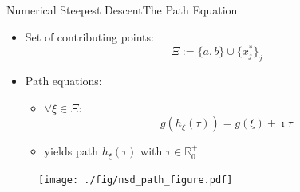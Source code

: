 \documentclass{beamer}
\begin{document}
\begin{frame}{Numerical Steepest Descent}{The Path Equation}
  \begin{minipage}{0.58\linewidth}
    \begin{itemize}
      \item Set of contributing points:
      \begin{equation*}
        \Xi := \{a, b\} \cup \{x^{*}_j\}_j
      \end{equation*}
    \end{itemize}
    \begin{itemize}
      \item Path equations:
      \begin{itemize}
        \item $\forall \xi \in \Xi$:
        \begin{equation*}
          g(h_\xi(\tau)) = g(\xi) + \imath \tau
        \end{equation*}
        \item yields path $h_{\xi}(\tau)$ with $\tau \in \mathbb{R}_0^{+}$
      \end{itemize}
    \end{itemize}
  \end{minipage}
  \begin{minipage}{0.40\linewidth}
    \begin{figure}
      \centering
      \texttt{[image: ./fig/nsd\_path\_figure.pdf]}
    \end{figure}
  \end{minipage}
\end{frame}
\end{document}
